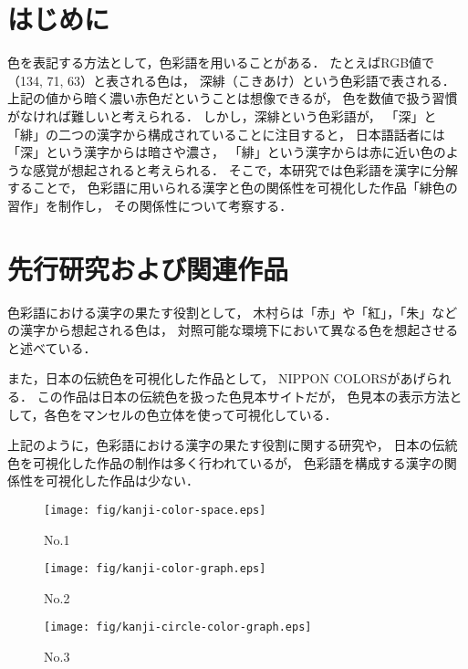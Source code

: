 \documentclass[a4j,twocolumn]{ujarticle} %
\newcommand{\workname}{緋色の習作}
\newcommand{\colorname}{色彩語}
\newcommand{\mysection}[1]{\vspace{-23pt}\section{#1}\vspace{-5pt}}
\begin{document}
\maketitle
\thispagestyle{myheadings}

\mysection{はじめに}

色を表記する方法として，\colorname{}を用いることがある．
たとえばRGB値で（134, 71, 63）と表される色は，
深緋（こきあけ）という\colorname{}で表される．
上記の値から暗く濃い赤色だということは想像できるが，
色を数値で扱う習慣がなければ難しいと考えられる．
しかし，深緋という\colorname{}が，
「深」と「緋」の二つの漢字から構成されていることに注目すると，
日本語話者には「深」という漢字からは暗さや濃さ，
「緋」という漢字からは赤に近い色のような感覚が想起されると考えられる．
そこで，本研究では\colorname{}を漢字に分解することで，
\colorname{}に用いられる漢字と色の関係性を可視化した作品「\workname{}」を制作し，
その関係性について考察する．

\mysection{先行研究および関連作品}

色彩語における漢字の果たす役割として，
木村ら\cite{Kimura1998}は「赤」や「紅」，「朱」などの漢字から想起される色は，
対照可能な環境下において異なる色を想起させると述べている．

また，日本の伝統色を可視化した作品として，
NIPPON COLORS\cite{NipponColors}があげられる．
この作品は日本の伝統色を扱った色見本サイトだが，
色見本の表示方法として，各色をマンセルの色立体を使って可視化している．

上記のように，色彩語における漢字の果たす役割に関する研究や，
日本の伝統色を可視化した作品の制作は多く行われているが，
色彩語を構成する漢字の関係性を可視化した作品は少ない．

\vspace{-1zh}

\begin{figure*}[h]
  \begin{center}
 \begin{minipage}{0.3\hsize}
  \begin{center}
   \texttt{[image: fig/kanji-color-space.eps]}
  \end{center}
  \caption{No.1}
  \label{fig:no1}
 \end{minipage}
 \begin{minipage}{0.3\hsize}
 \begin{center}
  \texttt{[image: fig/kanji-color-graph.eps]}
 \end{center}
  \caption{No.2}
  \label{fig:no2}
 \end{minipage}
 \begin{minipage}{0.3\hsize}
 \begin{center}
  \texttt{[image: fig/kanji-circle-color-graph.eps]}
 \end{center}
  \caption{No.3}
  \label{fig:no3}
 \end{minipage}
 \end{center}
\end{figure*}
\end{document}
